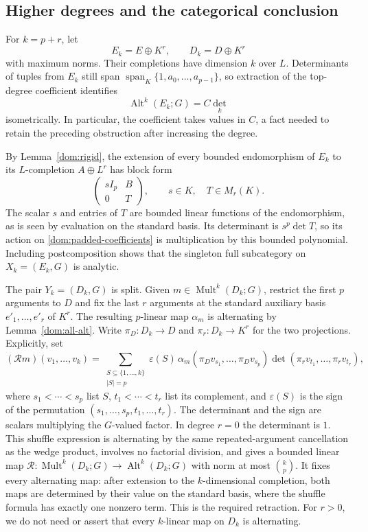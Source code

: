 \documentclass[11pt]{amsart}
\theoremstyle{definition}
\theoremstyle{remark}
\numberwithin{equation}{section}
\newcommand{\Alt}{\operatorname{Alt}}
\newcommand{\Mult}{\operatorname{Mult}}
\newcommand{\spn}{\operatorname{span}}
\begin{document}
\subsection{Higher degrees and the categorical conclusion}

For $k=p+r$, let
\[
E_k=E\oplus K^r,\qquad D_k=D\oplus K^r
\]
with maximum norms. Their completions have dimension $k$ over $L$. Determinants of tuples from $E_k$
still span $\spn_K\{1,a_0,\ldots,a_{p-1}\}$, so extraction of the top-degree coefficient identifies
\begin{equation}\label{dom:padded-coefficients}
\Alt^k(E_k;G)=C\det_k
\end{equation}
isometrically. In particular, the coefficient takes values in $C$, a fact needed to retain the preceding
obstruction after increasing the degree.

By Lemma~\ref{dom:rigid}, the extension of every bounded endomorphism of $E_k$ to its
$L$\nobreakdash-completion $A\oplus L^r$ has block form
\[
\begin{pmatrix}sI_p&B\\0&T\end{pmatrix},\qquad s\in K,\quad T\in M_r(K).
\]
The scalar $s$ and entries of $T$ are bounded linear functions of the endomorphism, as is seen by
evaluation on the standard basis. Its determinant is $s^p\det T$, so its action on
\eqref{dom:padded-coefficients} is multiplication by this bounded polynomial. Including postcomposition
shows that the singleton full subcategory on $X_k=(E_k,G)$ is analytic.

The pair $Y_k=(D_k,G)$ is split. Given $m\in\Mult^k(D_k;G)$, restrict the first $p$ arguments to
$D$ and fix the last $r$ arguments at the standard auxiliary basis $e'_1,\ldots,e'_r$ of $K^r$.
The resulting $p$-linear map $\alpha_m$ is alternating by Lemma~\ref{dom:all-alt}. Write
$\pi_D\colon D_k\to D$ and $\pi_r\colon D_k\to K^r$ for the two projections. Explicitly, set
\[
 (\mathcal Rm)(v_1,\ldots,v_k)=
 \sum_{\substack{S\subseteq\{1,\ldots,k\}\\|S|=p}}
 \varepsilon(S)\,
 \alpha_m(\pi_Dv_{s_1},\ldots,\pi_Dv_{s_p})
 \det(\pi_rv_{t_1},\ldots,\pi_rv_{t_r}),
\]
where $s_1<\cdots<s_p$ list $S$, $t_1<\cdots<t_r$ list its complement, and $\varepsilon(S)$
is the sign of the permutation $(s_1,\ldots,s_p,t_1,\ldots,t_r)$. The determinant and the sign
are scalars multiplying the $G$-valued factor. In degree $r=0$ the determinant is $1$.
This shuffle expression is alternating by the same repeated-argument cancellation as the wedge
product, involves no factorial division, and gives a bounded linear map
$\mathcal R\colon\Mult^k(D_k;G)\to\Alt^k(D_k;G)$ with norm at most $\binom{k}{p}$.
It fixes every alternating map: after extension to the $k$\nobreakdash-dimensional completion, both maps
are determined by their value on the standard basis, where the shuffle formula has exactly one nonzero
term. This is the required retraction. For $r>0$, we do not need or assert that every $k$\nobreakdash-linear
map on $D_k$ is alternating.
\end{document}

